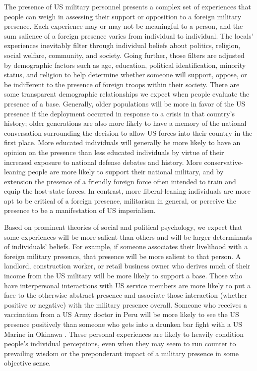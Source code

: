 {	The presence of US military personnel presents a complex set of experiences that people can weigh in assessing their support or opposition to a foreign military presence. Each experience may or may not be meaningful to a person, and the sum salience of a foreign presence varies from individual to individual. The locals' experiences inevitably filter through individual beliefs about politics, religion, social welfare, community, and society. Going further, those filters are adjusted by demographic factors such as age, education, political identification, minority status, and religion to help determine whether someone will support, oppose, or be indifferent to the presence of foreign troops within their society. There are some transparent demographic relationships we expect when people evaluate the presence of a base. Generally, older populations will be more in favor of the US presence if the deployment occurred in response to a crisis in that country's history; older generations are also more likely to have a memory of the national conversation surrounding the decision to allow US forces into their country in the first place. More educated individuals will generally be more likely to have an opinion on the presence than less educated individuals by virtue of their increased exposure to national defense debates and history. More conservative-leaning people are more likely to support their national military, and by extension the presence of a friendly foreign force often intended to train and equip the host-state forces. In contrast, more liberal-leaning individuals are more apt to be critical of a foreign presence, militarism in general, or perceive the presence to be a manifestation of US imperialism.
	
	Based on prominent theories of social and political psychology, we expect that some experiences will be more salient than others and will be larger determinants of individuals' beliefs. For example, if someone associates their livelihood with a foreign military presence, that presence will be more salient to that person. A landlord, construction worker, or retail business owner who derives much of their income from the US military will be more likely to support a base. Those who have interpersonal interactions with US service members are more likely to put a face to the otherwise abstract presence and associate those interaction (whether positive or negative) with the military presence overall\cite{Allen2020}. Someone who receives a vaccination from a US Army doctor in Peru will be more likely to see the US presence positively than someone who gets into a drunken bar fight with a US Marine in Okinawa \cite{Flynn2018}. These personal experiences are likely to heavily condition people's individual perceptions, even when they may seem to run counter to prevailing wisdom or the preponderant impact of a military presence in some objective sense.
	
}
